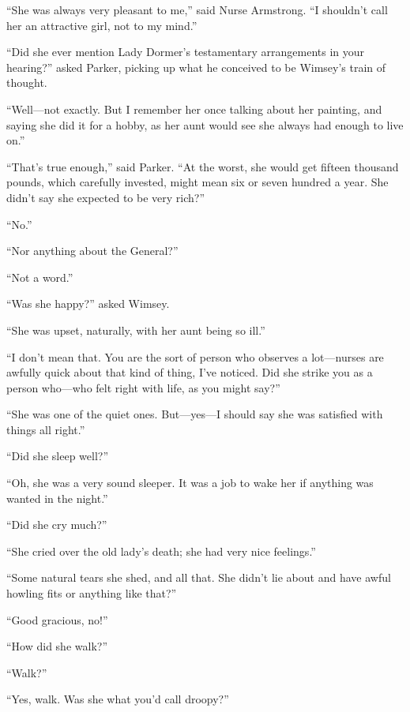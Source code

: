 \enquote{She was always very pleasant to me,} said Nurse Armstrong. \enquote{I shouldn't call her an attractive girl, not to my mind.}

\enquote{Did she ever mention Lady Dormer's testamentary arrangements in your hearing?} asked Parker, picking up what he conceived to be Wimsey's train of thought.

\enquote{Well\allowbreak---\allowbreak not exactly. But I remember her once talking about her painting, and saying she did it for a hobby, as her aunt would see she always had enough to live on.}

\enquote{That's true enough,} said Parker. \enquote{At the worst, she would get fifteen thousand pounds, which carefully invested, might mean six or seven hundred a year. She didn't say she expected to be very rich?}

\enquote{No.}

\enquote{Nor anything about the General?}

\enquote{Not a word.}

\enquote{Was she happy?} asked Wimsey.

\enquote{She was upset, naturally, with her aunt being so ill.}

\enquote{I don't mean that. You are the sort of person who observes a lot\allowbreak---\allowbreak nurses are awfully quick about that kind of thing, I've noticed. Did she strike you as a person who\allowbreak---\allowbreak who felt right with life, as you might say?}

\enquote{She was one of the quiet ones. But\allowbreak---\allowbreak yes---I should say she was satisfied with things all right.}

\enquote{Did she sleep well?}

\enquote{Oh, she was a very sound sleeper. It was a job to wake her if anything was wanted in the night.}

\enquote{Did she cry much?}

\enquote{She cried over the old lady's death; she had very nice feelings.}

\enquote{Some natural tears she shed, and all that. She didn't lie about and have awful howling fits or anything like that?}

\enquote{Good gracious, no!}

\enquote{How did she walk?}

\enquote{Walk?}

\enquote{Yes, walk. Was she what you'd call droopy?}

